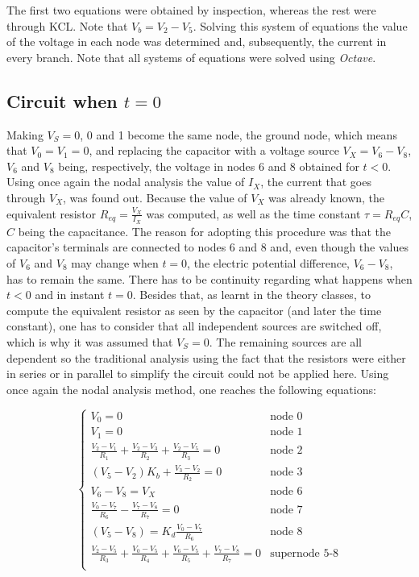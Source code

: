 The first two equations were obtained by inspection, whereas the rest were through KCL. Note that $V_b=V_2-V_5$.
Solving this system of equations the value of the voltage in each node was determined and, subsequently, the current in every branch.
Note that all systems of equations were solved using \textit{Octave}.






\subsection{Circuit when $t=0$} %
Making $V_S=0$, 0 and 1 become the same node, the ground node, which means that $V_0=V_1=0$, and replacing the capacitor with a voltage source $V_X=V_6-V_8$, $V_6$ and $V_8$ being, respectively, the voltage in nodes 6 and 8 obtained for $t<0$.
Using once again the nodal analysis the value of $I_X$, the current that goes through $V_X$, was found out. Because the value of $V_X$ was already known, the equivalent resistor $R_{eq} = \frac{V_X}{I_X}$ was computed, as well as the time constant $\tau = R_{eq}C$, $C$ being the capacitance.
The reason for adopting this procedure was that the capacitor's terminals are connected to nodes 6 and 8 and, even though the values of $V_6$ and $V_8$ may change when $t=0$, the electric potential difference, $V_6-V_8$, has to remain the same. There has to be continuity regarding what happens when $t<0$ and in instant $t=0$. Besides that, as learnt in the theory classes, to compute the equivalent resistor as seen by the capacitor (and later the time constant), one has to consider that all independent sources are switched off, which is why it was assumed that $V_S=0$. The remaining sources are all dependent so the traditional analysis using the fact that the resistors were either in series or in parallel to simplify the circuit could not be applied here.
Using once again the nodal analysis method, one reaches the following equations:

\begin{equation}
  \begin{cases}
  V_0=0 & \mbox{node 0} \\
  V_1=0 & \mbox{node 1} \\
  \frac{V_2-V_1}{R_1}+\frac{V_2-V_3}{R_2}+\frac{V_2-V_5}{R_3} = 0 & \mbox{node 2} \\
  (V_5-V_2)K_b + \frac{V_3-V_2}{R_2} = 0 & \mbox{node 3} \\
  V_6-V_8 = V_X & \mbox{node 6} \\
  \frac{V_0-V_7}{R_6} - \frac{V_7-V_8}{R_7} = 0 & \mbox{node 7} \\
  (V_5-V_8) = K_d \frac{V_0-V_7}{R_6} & \mbox{node 8} \\
  \frac{V_2-V_5}{R_3} + \frac{V_0-V_5}{R_4} + \frac{V_6-V_5}{R_5} + \frac{V_7-V_8}{R_7} = 0 & \mbox{supernode 5-8} \\ 
  \end{cases}
\end{equation}


